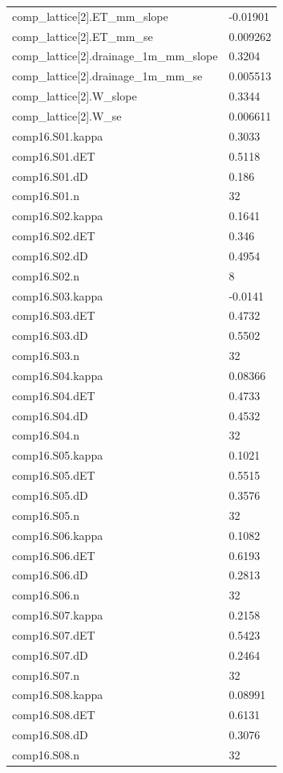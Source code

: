 {\begin{longtable}{p{}p{}}
{}comp\_lattice[2].ET\_mm\_slope & -0.01901\\
{}comp\_lattice[2].ET\_mm\_se & 0.009262\\
{}comp\_lattice[2].drainage\_1m\_mm\_slope & 0.3204\\
{}comp\_lattice[2].drainage\_1m\_mm\_se & 0.005513\\
{}comp\_lattice[2].W\_slope & 0.3344\\
{}comp\_lattice[2].W\_se & 0.006611\\
{}comp16.S01.kappa & 0.3033\\
{}comp16.S01.dET & 0.5118\\
{}comp16.S01.dD & 0.186\\
{}comp16.S01.n & 32\\
{}comp16.S02.kappa & 0.1641\\
{}comp16.S02.dET & 0.346\\
{}comp16.S02.dD & 0.4954\\
{}comp16.S02.n & 8\\
{}comp16.S03.kappa & -0.0141\\
{}comp16.S03.dET & 0.4732\\
{}comp16.S03.dD & 0.5502\\
{}comp16.S03.n & 32\\
{}comp16.S04.kappa & 0.08366\\
{}comp16.S04.dET & 0.4733\\
{}comp16.S04.dD & 0.4532\\
{}comp16.S04.n & 32\\
{}comp16.S05.kappa & 0.1021\\
{}comp16.S05.dET & 0.5515\\
{}comp16.S05.dD & 0.3576\\
{}comp16.S05.n & 32\\
{}comp16.S06.kappa & 0.1082\\
{}comp16.S06.dET & 0.6193\\
{}comp16.S06.dD & 0.2813\\
{}comp16.S06.n & 32\\
{}comp16.S07.kappa & 0.2158\\
{}comp16.S07.dET & 0.5423\\
{}comp16.S07.dD & 0.2464\\
{}comp16.S07.n & 32\\
{}comp16.S08.kappa & 0.08991\\
{}comp16.S08.dET & 0.6131\\
{}comp16.S08.dD & 0.3076\\
{}comp16.S08.n & 32\\

\end{longtable}}

